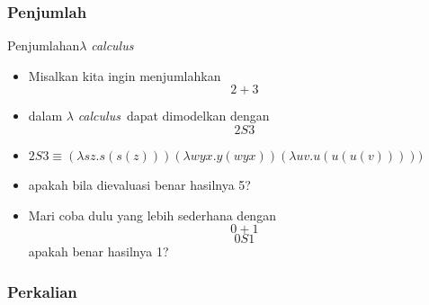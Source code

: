 \documentclass[aspectratio=1610,10pt,handout]{beamer}
\newcommand{\lc}{$\lambda$ {\it calculus}\ }
\begin{document}
\subsubsection{Penjumlah}

\begin{frame}{Penjumlahan}{\lc }

	\begin{itemize}
		\item<1-> Misalkan kita ingin menjumlahkan $$2+3$$

		\item<2-> dalam \lc dapat dimodelkan dengan $$2S3$$

		\item<3-> $2S3 \equiv (\lambda sz. s(s(z))) (\lambda w y x. y (wyx)) (\lambda u v. u (u (u (v)))))  $

		\item<4-> apakah bila dievaluasi benar hasilnya 5?
		\item<5-> Mari coba dulu yang lebih sederhana dengan $$0+1$$ $$0S1$$ apakah benar hasilnya 1?
	\end{itemize}

\end{frame}

\subsubsection{Perkalian}
\end{document}
